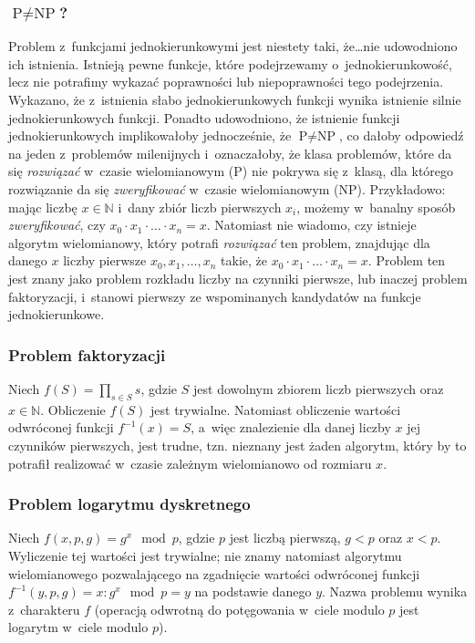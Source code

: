 \documentclass[12pt,a4paper,twoside]{article}
\begin{document}
\subsubsection{$\textrm{P} \neq \textrm{NP}$?}
Problem z~funkcjami jednokierunkowymi jest niestety taki, że\ldots nie
udowodniono ich istnienia. Istnieją pewne funkcje, które podejrzewamy
o~jednokierunkowość, lecz nie potrafimy wykazać poprawności lub niepoprawności
tego podejrzenia. Wykazano, że z~istnienia słabo jednokierunkowych funkcji
wynika istnienie silnie jednokierunkowych funkcji. Ponadto udowodniono, że
istnienie funkcji jednokierunkowych implikowałoby jednocześnie, że $\textrm{P}
\neq \textrm{NP}$, co dałoby odpowiedź na jeden z~problemów milenijnych
i~oznaczałoby, że klasa problemów, które da się \emph{rozwiązać} w~czasie
wielomianowym ($\textrm{P}$) nie pokrywa się z~klasą, dla którego rozwiązanie
da się \emph{zweryfikować} w~czasie wielomianowym ($\textrm{NP}$). Przykładowo:
mając liczbę $x \in \mathbb{N}$ i~dany zbiór liczb pierwszych $x_i$, możemy
w~banalny sposób \emph{zweryfikować}, czy $x_0 \cdot x_1 \cdot \ldots \cdot x_n
= x$. Natomiast nie wiadomo, czy istnieje algorytm wielomianowy, który potrafi
\emph{rozwiązać} ten problem, znajdując dla danego $x$ liczby pierwsze $x_0,
x_1, \ldots, x_n$ takie, że $x_0 \cdot x_1 \cdot \ldots \cdot x_n = x$. Problem
ten jest znany jako problem rozkładu liczby na czynniki pierwsze, lub inaczej
problem faktoryzacji, i~stanowi pierwszy ze wspominanych kandydatów na funkcje
jednokierunkowe.



\subsubsection{Problem faktoryzacji}
Niech $f(S) = \prod_{s \in S} s$, gdzie $S$ jest dowolnym zbiorem liczb
pierwszych oraz $x \in \mathbb{N}$. Obliczenie $f(S)$ jest trywialne. Natomiast
obliczenie wartości odwróconej funkcji $f^{-1}(x)=S$, a~więc znalezienie dla
danej liczby $x$ jej czynników pierwszych, jest trudne, tzn. nieznany jest
żaden algorytm, który by to potrafił realizować w~czasie zależnym wielomianowo
od rozmiaru $x$.



\subsubsection{Problem logarytmu dyskretnego}
Niech $f(x, p, g) = g^x \mod p$, gdzie $p$ jest liczbą pierwszą, $g < p$ oraz
$x < p$. Wyliczenie tej wartości jest trywialne; nie znamy natomiast algorytmu
wielomianowego pozwalającego na zgadnięcie wartości odwróconej funkcji
\mbox{$f^{-1}(y, p, g) = x : g^x \mod p = y$} na podstawie danego $y$. Nazwa
problemu wynika z~charakteru $f$ (operacją odwrotną do potęgowania w~ciele
modulo $p$ jest logarytm w~ciele modulo $p$).
\end{document}
